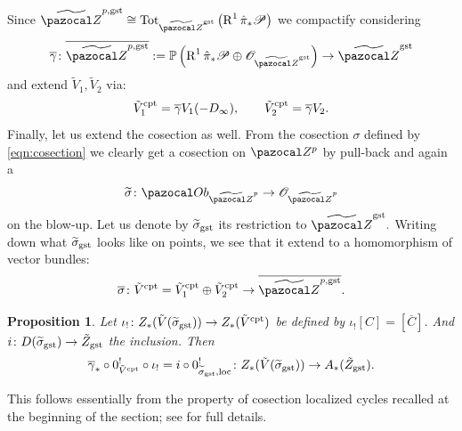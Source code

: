 \documentclass[11pt]{amsart}
\newcommand{\PP}{\mathbb P}
\newcommand{\OO}{\mathcal O}
\renewcommand{\to}{\rightarrow}
\newcommand{\Z}{\pazocal Z}
\newcommand{\tZ}{\widetilde{\pazocal Z}}
\newcommand{\tZp}{\widetilde{\pazocal Z}^p}
\newcommand{\R}{\operatorname{R}}
\theoremstyle{plain}
\newtheorem{prop}[thm]{Proposition}
\theoremstyle{definition}
\begin{document}
Since $\tZ^{p,\rm{gst}}\cong\operatorname{Tot}_{\tZ^{\rm{gst}}}\left(\R^1\hat{\pi}_*\mathcal P\right)$ we compactify considering
\[\overline{\gamma}\colon \overline{\tZ^{p,\rm{gst}}}:=\PP\left(\R^1\hat{\pi}_*\mathcal P\oplus \OO_{\tZ^{\rm{gst}}}\right)\to \tZ^{\rm{gst}}\]
and extend $\tilde{V}_1,\tilde{V}_2$ via:
\[\tilde{V}^{\rm{cpt}}_1=\overline{\gamma}V_1(-D_{\infty}),\qquad \tilde{V}^{\rm{cpt}}_2=\overline{\gamma}V_2.\]
Finally, let us extend the cosection as well. From the cosection $\sigma$ defined by \ref{eqn:cosection} we clearly get a cosection on $\Z^p$ by pull-back and again a 
\[\widetilde{\sigma}\colon \pazocal Ob_{\tZp}\to\OO_{\tZp} \]
 on the blow-up. Let us denote by $\widetilde{\sigma}_{\rm{gst}}$ its restriction to $\tZ^{\rm{gst}}.$
 Writing down what $\widetilde{\sigma}_{\rm{gst}}$ looks like on points\cite[Lemma~6.2]{CL}, we see that it extend to a homomorphism of vector bundles:
 \[\overline{\sigma}\colon\tilde{V}^{\rm{cpt}}=\tilde{V}^{\rm{cpt}}_1\oplus \tilde{V}^{\rm{cpt}}_2\to \overline{\tZ^{p,\rm{gst}}}.\]
 \begin{prop}
 Let $\iota_{!}\colon Z_*(\tilde{V}(\widetilde{\sigma}_{\rm{gst}}))\to Z_*(\tilde{V}^{\rm{cpt}})$ be defined by 
 $\iota_{!}[C]=[\overline{C}].$ And $i\colon D(\widetilde{\sigma}_{\rm{gst}})\to \tilde{Z}_{\rm{gst}}$ the inclusion. Then
 \[\overline{\gamma}_*\circ 0^{!}_{\tilde{V}^{\rm{cpt}}}\circ\iota_{!}=i\circ 0^{!}_{\widetilde{\sigma}_{\rm{gst}},\rm{loc}}\colon  Z_*(\tilde{V}(\widetilde{\sigma}_{\rm{gst}}))\to A_*(\tilde{Z}_{\rm{gst}}).\]
 \end{prop}
 This follows essentially from the property of cosection localized cycles recalled at the beginning of the section; see \cite[Proposition~6.4]{CL} for full details.
\end{document}
